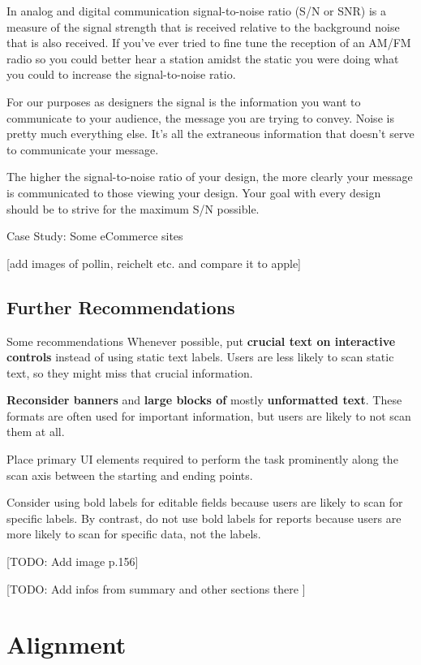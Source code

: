 In analog and digital communication signal-to-noise ratio (S/N or SNR) is a measure of the signal strength that is received relative to the background noise that is also received. If you’ve ever tried to fine tune the reception of an AM/FM radio so you could better hear a station amidst the static you were doing what you could to increase the signal-to-noise ratio.

For our purposes as designers the signal is the information you want to communicate to your audience, the message you are trying to convey. Noise is pretty much everything else. It’s all the extraneous information that doesn’t serve to communicate your message.

The higher the signal-to-noise ratio of your design, the more clearly your message is communicated to those viewing your design. Your goal with every design should be to strive for the maximum S/N possible.

Case Study: Some eCommerce sites

[add images of pollin, reichelt etc. and compare it to apple] 


\subsection{Further Recommendations} %
\label{sub:general_recommendations}

Some recommendations
Whenever possible, put \textbf{crucial text on interactive controls} instead of using static text labels. Users are less likely to scan static text, so they might miss that crucial information.

\textbf{Reconsider banners} and \textbf{large blocks of} mostly \textbf{unformatted text}. These formats are often used for important information, but users are likely to not scan them at all.

Place primary UI elements required to perform the task prominently along the scan axis between the starting and ending points.

Consider using bold labels for editable fields because users are likely to scan for specific labels. By contrast, do not use bold labels for reports because users are more likely to scan for specific data, not the labels.

[TODO: Add image p.156]

[TODO: Add infos from summary and other sections there ]





\section{Alignment} %
\label{sec:alignment}

